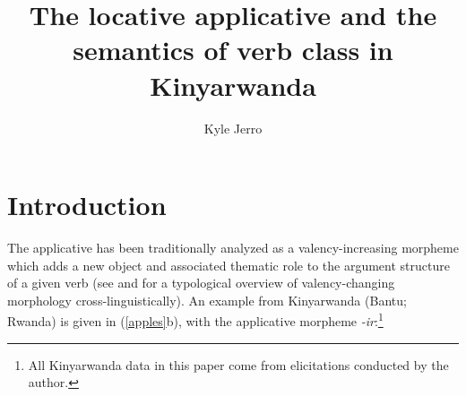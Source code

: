 \documentclass[output=paper]{langsci/langscibook}
\title{The locative applicative and the semantics of verb class in Kinyarwanda}
\author{%
 Kyle Jerro \affiliation{University of Texas at Austin } 
}
\begin{document}
\newcommand{\comment}{\bf\color{blue}}
\newcommand{\p}{\leavevmode\llap{(}}
\newcommand{\odd}{\leavevmode\llap{\#}}
\newcommand{\odder}{\leavevmode\llap{?\#}}
\newcommand{\q}{\leavevmode\llap{?}}
\newcommand{\hm}{\footnotesize\leavevmode\llap{?(?)}}
\newcommand{\qq}{\leavevmode\llap{??}}
\newcommand{\bad}{\leavevmode\llap{*}}
\newcommand{\huh}{\leavevmode\llap{?*}}

\def\emdash{\hbox{~--\ }}
\def\endash{\hbox{--}}




 
 
 



 
\section{Introduction}%

 The applicative has been traditionally analyzed as a valency-increasing morpheme which adds a new object and associated thematic role to the argument structure of a given verb (see \citealt{dixon:1997} and \citealt{peterson:2007} for a typological overview of valency-changing morphology cross-linguistically). An example from Kinyarwanda (Bantu; Rwanda) is given in (\ref{apples}b), with the applicative morpheme \emph{-ir}:\footnote{All Kinyarwanda data in this paper come from elicitations conducted by the author.}
\end{document}
